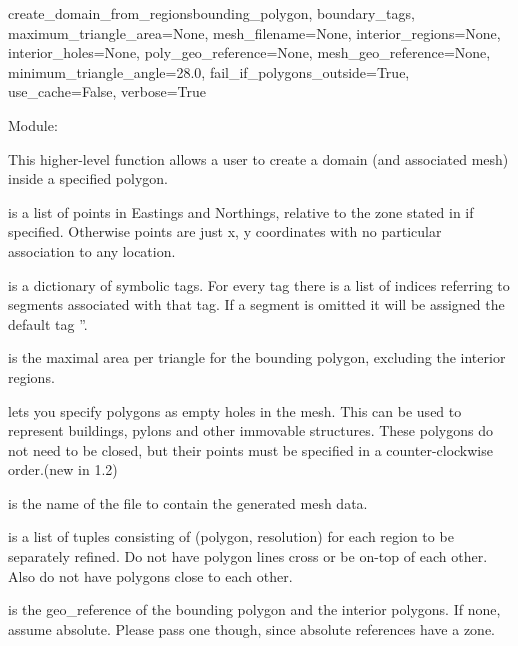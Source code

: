 \documentclass{manual}
\begin{document}
\begin{funcdesc}{create_domain_from_regions}{bounding_polygon,
                                             boundary_tags,
                                             maximum_triangle_area=None,
                                             mesh_filename=None,
                                             interior_regions=None,
                                             interior_holes=None,
                                             poly_geo_reference=None,
                                             mesh_geo_reference=None,
                                             minimum_triangle_angle=28.0,
                                             fail_if_polygons_outside=True,
                                             use_cache=False,
                                             verbose=True}

Module: 

This higher-level function allows a user to create a domain (and associated mesh)
inside a specified polygon.

 is a list of points in Eastings and Northings,
relative to the zone stated in  if specified.
Otherwise points are just x, y coordinates with no particular
association to any location.

 is a dictionary of symbolic tags. For every tag there
is a list of indices referring to segments associated with that tag.
If a segment is omitted it will be assigned the default tag ''.

 is the maximal area per triangle
for the bounding polygon, excluding the interior regions.

 lets you specify polygons as empty holes in the mesh.
This can be used  to represent buildings, pylons and other immovable
structures. These polygons do not need to be closed, but their points must be
specified in a counter-clockwise order.(new in 1.2)

 is the name of the file to contain the generated 
mesh data.

 is a list of tuples consisting of (polygon,
resolution) for each region to be separately refined. Do not have
polygon lines cross or be on-top of each other.  Also do not have
polygons close to each other.

 is the geo_reference of the bounding polygon and
the interior polygons.
If none, assume absolute.  Please pass one though, since absolute
references have a zone.


\end{funcdesc}
\end{document}
